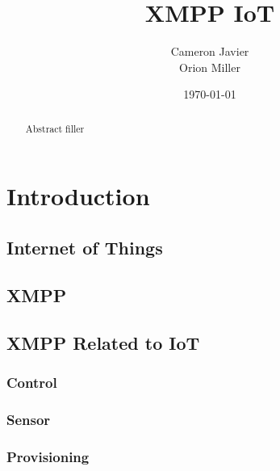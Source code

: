 \documentclass{sig-alternate}
\begin{document}
\title{XMPP IoT}
\author{Cameron Javier\\
        Orion Miller}
\date{\today}
\maketitle

\begin{abstract}
Abstract filler
\end{abstract}




\section{Introduction}



\subsection{Internet of Things}

\subsection{XMPP}



\subsection{XMPP Related to IoT}



\subsubsection{Control}



\subsubsection{Sensor}



\subsubsection{Provisioning}


\end{document}
